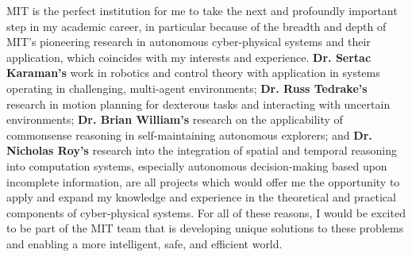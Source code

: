 \documentclass[11pt]{letter}
\begin{document}
MIT is the perfect institution for me to take the next and profoundly important step in my academic career, in particular because of the breadth and depth of MIT’s pioneering research in autonomous cyber-physical systems and their application, which coincides with my interests and experience.  \textbf{Dr. Sertac Karaman's} work in robotics and control theory with application in systems operating in challenging, multi-agent environments; \textbf{Dr. Russ Tedrake's} research in motion planning for dexterous tasks and interacting with uncertain environments; \textbf{Dr. Brian William's} research on the applicability of commonsense reasoning in self-maintaining autonomous explorers; and \textbf{Dr. Nicholas Roy's} research into the integration of spatial and temporal reasoning into computation systems, especially autonomous decision-making based upon incomplete information, are all projects which would offer me the opportunity to apply and expand my knowledge and experience in the theoretical and practical components of cyber‑physical systems.  For all of these reasons, I would be excited to be part of the MIT team that is developing unique solutions to these problems and enabling a more intelligent, safe, and efficient world.


\begin{comment}
{\bf \emph{References}}

[1] "Cyber-Physical Systems." Baheti and Gill

[2] "Optimization and Control of Cyber-Physical Vehicle Systems." Bradley and Atkins

\end{comment}
\end{document}
